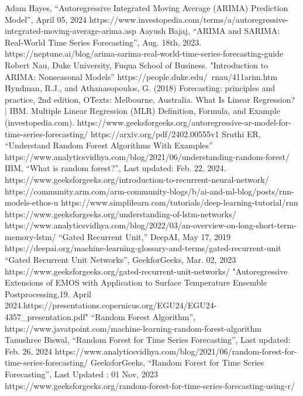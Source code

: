 \documentclass{ieeeojies}
\begin{document}
\begin{thebibliography}{00}
 Adam Hayes, “Autoregressive Integrated Moving Average (ARIMA) Prediction Model”, April 05, 2024
https://www.investopedia.com/terms/a/autoregressive-integrated-moving-average-arima.asp
 Aayush Bajaj, “ARIMA and SARIMA: Real-World Time Series Forecasting”, Aug. 18th, 2023.
https://neptune.ai/blog/arima-sarima-real-world-time-series-forecasting-guide
 Robert Nau, Duke University, Fuqua School of Business. "Introduction to ARIMA: Nonseasonal Models”
https://people.duke.edu/~rnau/411arim.htm
 Hyndman, R.J., and Athanasopoulos, G. (2018) Forecasting: principles and practice, 2nd edition, OTexts: Melbourne, Australia. 
 What Is Linear Regression? | IBM.
 Multiple Linear Regression (MLR) Definition, Formula, and Example (investopedia.com).
 https://www.geeksforgeeks.org/autoregressive-ar-model-for-time-series-forecasting/
https://arxiv.org/pdf/2402.00555v1
 Sruthi ER, “Understand Random Forest Algorithms With Examples”
https://www.analyticsvidhya.com/blog/2021/06/understanding-random-forest/
 IBM, “What is random forest?”, Last updated: Feb. 22, 2024.
 https://www.geeksforgeeks.org/introduction-to-recurrent-neural-network/
 https://community.arm.com/arm-community-blogs/b/ai-and-ml-blog/posts/rnn-models-ethos-u
  https://www.simplilearn.com/tutorials/deep-learning-tutorial/rnn
https://www.geeksforgeeks.org/understanding-of-lstm-networks/
https://www.analyticsvidhya.com/blog/2022/03/an-overview-on-long-short-term-memory-lstm/
“Gated Recurrent Unit,” DeepAI, May 17, 2019 https://deepai.org/machine-learning-glossary-and-terms/gated-recurrent-unit
“Gated Recurrent Unit Networks”, GeekforGeeks, Mar. 02, 2023 https://www.geeksforgeeks.org/gated-recurrent-unit-networks/
 "Autoregressive Extensions of EMOS with
Application to Surface Temperature Ensemble
Postprocessing,19. April 2024.https://presentations.copernicus.org/EGU24/EGU24-4357_presentation.pdf"
 “Random Forest Algorithm”, https://www.javatpoint.com/machine-learning-random-forest-algorithm
Tanushree Biswal, “Random Forest for Time Series Forecasting”, Last updated: Feb. 26, 2024
https://www.analyticsvidhya.com/blog/2021/06/random-forest-for-time-series-forecasting/
GeeksforGeeks, “Random Forest for Time Series Forecasting”, Last Updated : 01 Nov, 2023 https://www.geeksforgeeks.org/random-forest-for-time-series-forecasting-using-r/

\end{thebibliography}


\EOD
\end{document}
